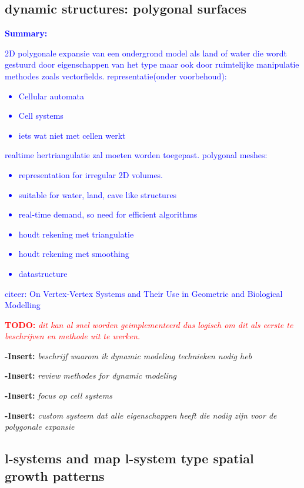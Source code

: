 \documentclass{article}
\newcommand{\todo}[1]{\textcolor{red}{\textbf{\newline TODO: }\it{#1} \newline}}
\newcommand{\inhoud}[1]{\textcolor{blue}{\textbf{\newline Summary: }\it{#1}}}
\newcommand{\voegtoe}[1]{\textcolor{MyDarkGreen}{\textbf{-Insert: }\it{#1}}}
\begin{document}
\subsection{dynamic structures: polygonal surfaces}
\inhoud{2D polygonale expansie van een ondergrond model als land of water die wordt gestuurd door eigenschappen van het type maar ook door ruimtelijke manipulatie methodes zoals vectorfields. representatie(onder voorbehoud): 
\begin{itemize}
\item Cellular automata
\item Cell systems
\item iets wat niet met cellen werkt  
\end{itemize}
realtime hertriangulatie zal moeten worden toegepast. 
polygonal meshes: 
\begin{itemize}
\item representation for irregular 2D volumes.  
\item suitable for water, land, cave like structures  
\item real-time demand, so need for efficient algorithms
\item houdt rekening met triangulatie
\item houdt rekening met smoothing
\item datastructure
\end{itemize}
citeer: On Vertex-Vertex Systems and Their Use in
Geometric and Biological Modelling
}

\todo{dit kan al snel worden geimplementeerd dus logisch om dit als eerste te beschrijven en methode uit te werken.}

\voegtoe{beschrijf waarom ik dynamic modeling technieken nodig heb}



\voegtoe{review methodes for dynamic modeling}


\voegtoe{focus op cell systems}


\voegtoe{custom systeem dat alle eigenschappen heeft die nodig zijn voor de polygonale expansie}



\cite{compgeom}
\cite{vertexsystems}

\subsection{l-systems and map l-system type spatial growth patterns}

\cite{lcreport}
\end{document}
